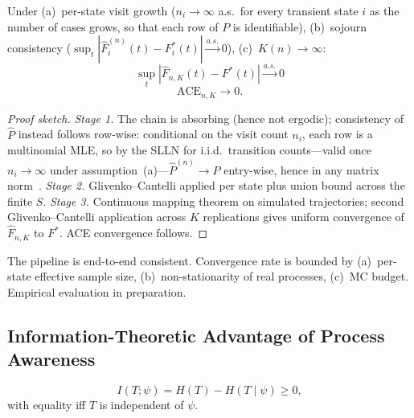 \begin{theorem}
\label{thm:pipeline-convergence}
Under (a)~per-state visit growth ($n_i \to \infty$ a.s.\ for every
transient state $i$ as the number of cases grows, so that each row of $P$
is identifiable), (b)~sojourn consistency
($\sup_t |\hat{F}_i^{(n)}(t) - F_i^*(t)| \xrightarrow{a.s.} 0$),
(c)~$K(n) \to \infty$:
\begin{equation}
\label{eq:pipeline-convergence}
\sup_t |\hat{F}_{n,K}(t) - F^*(t)| \xrightarrow{a.s.} 0
\end{equation}
\begin{equation}
\label{eq:ace-convergence}
\text{ACE}_{n,K} \to 0.
\end{equation}
\end{theorem}

\begin{proof}[Proof sketch]
\textit{Stage 1.} The chain is absorbing (hence not ergodic); consistency of
$\hat{P}$ instead follows row-wise: conditional on the visit count $n_i$,
each row is a multinomial MLE, so by the SLLN for i.i.d.\ transition
counts---valid once $n_i \to \infty$ under assumption~(a)---$\hat{P}^{(n)}
\to P$ entry-wise, hence in any matrix
norm~\cite{anderson1957statistical, billingsley1961statistical}.
\textit{Stage 2.} Glivenko–Cantelli applied per state plus union bound
across the finite $S$.
\textit{Stage 3.} Continuous mapping theorem on simulated trajectories;
second Glivenko–Cantelli application across $K$ replications gives
uniform convergence of $\hat{F}_{n,K}$ to $F^*$. ACE convergence follows.
\end{proof}

\begin{remark}
\label{rem:convergence-practical}
The pipeline is end-to-end consistent. Convergence rate is bounded by
(a)~per-state effective sample size, (b)~non-stationarity of real
processes, (c)~MC budget. Empirical evaluation in preparation.
\end{remark}


\subsection{Information-Theoretic Advantage of Process Awareness}
\label{sec:prop-information}

\begin{theorem}
\label{thm:information}
\begin{equation}
\label{eq:information-gain}
I(T; \psi) = H(T) - H(T \mid \psi) \geq 0,
\end{equation}
with equality iff $T$ is independent of $\psi$.
\end{theorem}

